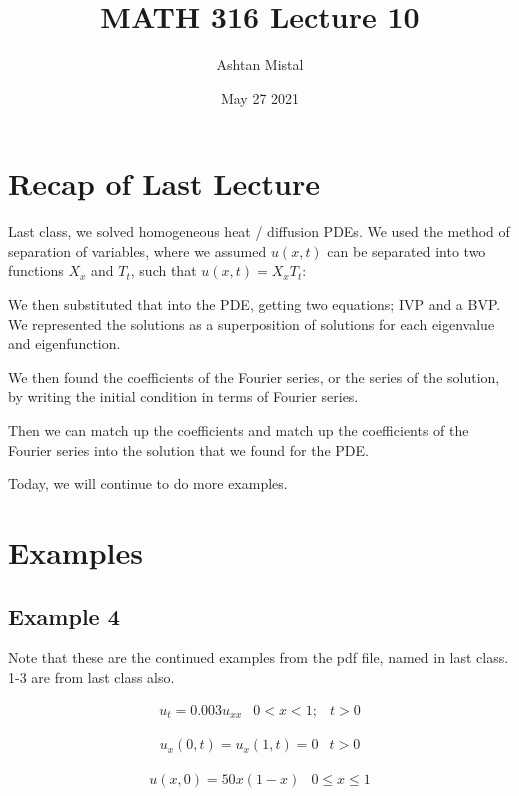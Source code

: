 \documentclass{article}
\title{MATH 316 Lecture 10}
\author{Ashtan Mistal}
\date{May 27 2021}
\begin{document}
\ifstandalone
\maketitle
\fi

\graphicspath{{./Lecture10/}}

\section{Recap of Last Lecture}

Last class, we solved homogeneous heat / diffusion PDEs. We used the method of separation of variables, where we assumed $u(x,t)$ can be separated into two functions $X_x$ and $T_t$, such that $u(x,t) = X_x T_t$:

We then substituted that into the PDE, getting two equations; IVP and a BVP. We represented the solutions as a superposition of solutions for each eigenvalue and eigenfunction. 

We then found the coefficients of the Fourier series, or the series of the solution, by writing the initial condition in terms of Fourier series. 

Then we can match up the coefficients and match up the coefficients of the Fourier series into the solution that we found for the PDE. 

Today, we will continue to do more examples. 

\section{Examples}

\subsection{Example 4}

Note that these are the continued examples from the pdf file, named in last class. 1-3 are from last class also. 

$$\begin{matrix} u_t = 0.003 u_{xx} & 0 < x < 1; & t > 0 \end{matrix}$$

$$\begin{matrix} u_x (0,t) = u_x (1,t) = 0 & t > 0 \end{matrix} $$

$$\begin{matrix} u(x,0) = 50x (1-x) & 0 \leq x \leq 1 \end{matrix}$$
\end{document}
